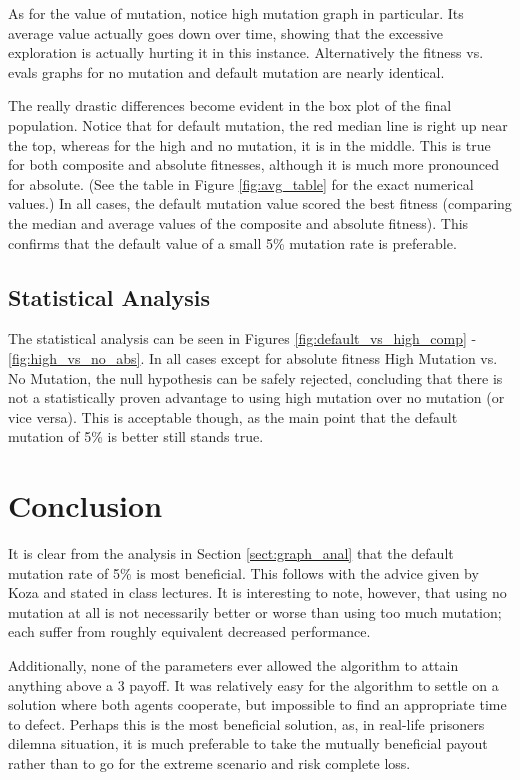 \documentclass[11pt]{article}
\begin{document}
As for the value of mutation, notice high mutation graph in particular. Its average value actually goes down over time, showing that the excessive exploration is actually hurting it in this instance. Alternatively the fitness vs. evals graphs for no mutation and default mutation are nearly identical.

The really drastic differences become evident in the box plot of the final population. Notice that for default mutation, the red median line is right up near the top, whereas for the high and no mutation, it is in the middle. This is true for both composite and absolute fitnesses, although it is much more pronounced for absolute. (See the table in Figure \ref{fig:avg_table} for the exact numerical values.) In all cases, the default mutation value scored the best fitness (comparing the median and average values of the composite and absolute fitness). This confirms that the default value of a small 5\% mutation rate is preferable.

\subsection{Statistical Analysis}\label{sect:stat_anal}
The statistical analysis can be seen in Figures \ref{fig:default_vs_high_comp} - \ref{fig:high_vs_no_abs}. In all cases except for absolute fitness High Mutation vs. No Mutation, the null hypothesis can be safely rejected, concluding that there is not a statistically proven advantage to using high mutation over no mutation (or vice versa). This is acceptable though, as the main point that the default mutation of 5\% is better still stands true.

\section{Conclusion}\label{sect:conclusion}
It is clear from the analysis in Section \ref{sect:graph_anal} that the default mutation rate of 5\% is most beneficial. This follows with the advice given by Koza and stated in class lectures. It is interesting to note, however, that using no mutation at all is not necessarily better or worse than using too much mutation; each suffer from roughly equivalent decreased performance. 

Additionally, none of the parameters ever allowed the algorithm to attain anything above a 3 payoff. It was relatively easy for the algorithm to settle on a solution where both agents cooperate, but impossible to find an appropriate time to defect. Perhaps this is the most beneficial solution, as, in real-life prisoners dilemna situation, it is much preferable to take the mutually beneficial payout rather than to go for the extreme scenario and risk complete loss.
\end{document}
